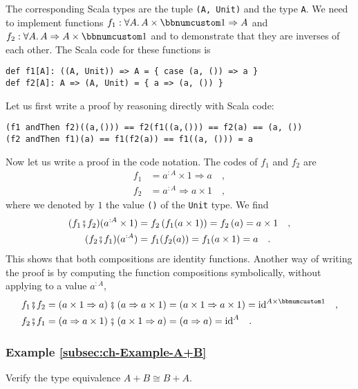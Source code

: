 The corresponding Scala types are the tuple \lstinline!(A, Unit)!
and the type \lstinline!A!. We need to implement functions $f_{1}:\forall A.\,A\times\bbnum 1\Rightarrow A$
and $f_{2}:\forall A.\,A\Rightarrow A\times\bbnum 1$ and to demonstrate
that they are inverses of each other. The Scala code for these functions
is
\begin{lstlisting}
def f1[A]: ((A, Unit)) => A = { case (a, ()) => a }
def f2[A]: A => (A, Unit) = { a => (a, ()) }
\end{lstlisting}
Let us first write a proof by reasoning directly with Scala code:
\begin{lstlisting}
(f1 andThen f2)((a,())) == f2(f1((a,())) == f2(a) == (a, ())
(f2 andThen f1)(a) == f1(f2(a)) == f1((a, ())) = a
\end{lstlisting}
Now let us write a proof in the code notation. The codes of $f_{1}$
and $f_{2}$ are
\begin{align*}
f_{1} & =a^{:A}\times1\Rightarrow a\quad,\\
f_{2} & =a^{:A}\Rightarrow a\times1\quad,
\end{align*}
where we denoted by $1$ the value \lstinline!()! of the \lstinline!Unit!
type. We find
\begin{align*}
(f_{1}\bef f_{2})(a^{:A}\times1) & =f_{2}\left(f_{1}(a\times1)\right)=f_{2}\left(a\right)=a\times1\quad,\\
(f_{2}\bef f_{1})(a^{:A}) & =f_{1}(f_{2}(a))=f_{1}(a\times1)=a\quad.
\end{align*}
This shows that both compositions are identity functions. Another
way of writing the proof is by computing the function compositions
symbolically, without applying to a value $a^{:A}$,
\begin{align*}
f_{1}\bef f_{2} & =\left(a\times1\Rightarrow a\right)\bef\left(a\Rightarrow a\times1\right)=\left(a\times1\Rightarrow a\times1\right)=\text{id}^{A\times\bbnum 1}\quad,\\
f_{2}\bef f_{1} & =\left(a\Rightarrow a\times1\right)\bef\left(a\times1\Rightarrow a\right)=\left(a\Rightarrow a\right)=\text{id}^{A}\quad.
\end{align*}


\subsubsection{Example \label{subsec:ch-Example-A+B}\ref{subsec:ch-Example-A+B}}

Verify the type equivalence $A+B\cong B+A$.

